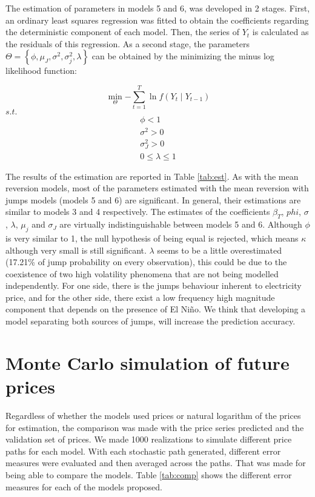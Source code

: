 \documentclass[3p]{elsarticle}
\begin{document}
The estimation of parameters in models 5 and 6, was developed in 2 stages. First, an ordinary least squares regression was fitted to obtain the coefficients regarding the deterministic component of each model. Then, the series of $Y_t$ is calculated as the residuals of this regression. As a second stage, the parameters $\Theta=\left \{ \phi,\mu_J,\sigma^2,\sigma_j^2,\lambda\right \}$ can be obtained by the minimizing the minus log likelihood function:


\begin{equation}
\label{eq:FO}
\min_{\Theta}{-\sum_{t=1}^{T}\ln{f(Y_t\mid Y_{t-1})}} 
\end{equation}
$s.t.$
\begin{equation}
\label{eq:res}
\begin{split}
\phi<1\\
\sigma^2>0\\
\sigma^2_J>0\\
0\leq \lambda \leq 1
\end{split}
\end{equation}

The results of the estimation are reported in Table \ref{tab:est}. As with the mean reversion models, most of the parameters estimated with the mean reversion with jumps models (models 5 and 6) are significant. In general, their estimations are similar to models 3 and 4 respectively. The estimates of the coefficients $\beta_T$, $phi$, $\sigma$, $\lambda$, $\mu_j$ and $\sigma_J$ are virtually indistinguishable between models 5 and 6. Although $\phi$ is very similar to 1, the null hypothesis of being equal is rejected, which means $\kappa$ although very small is still significant. $\lambda$ seems to be a little overestimated (17.21\% of jump probability on every observation), this could be due to the coexistence of two high volatility phenomena that are not being modelled independently. For one side, there is the jumps behaviour inherent to electricity price, and for the other side, there exist a low frequency high magnitude component that depends on the presence of El Ni\~no. We think that developing a model separating both sources of jumps, will increase the prediction accuracy.
 
\section{Monte Carlo simulation of future prices}\label{ch:MCSim}
Regardless of whether the models used prices or natural logarithm of the prices for estimation, the comparison was made with the price series predicted and the validation set of prices. We made 1000 realizations to simulate different price paths for each model. With each stochastic path generated, different error measures were evaluated and then averaged across the paths. That was made for being able to compare the models. Table \ref{tab:comp} shows the different error measures for each of the models proposed.
\end{document}
